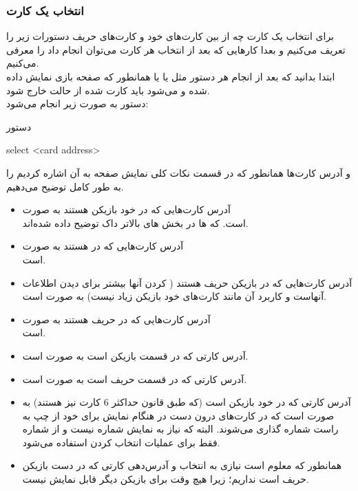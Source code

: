 \documentclass[]{article}
\begin{document}
\subsubsection*{{\titr انتخاب یک کارت}}
برای انتخاب یک کارت چه از بین کارت‌های خود و کارت‌های حریف دستورات زیر را 
تعریف می‌کنیم و بعدا کارهایی که بعد از انتخاب هر کارت می‌توان انجام داد را 
معرفی می‌کنیم.
\\
ابتدا بدانید که بعد از انجام هر دستور مثل  یا  یا 
 همانطور که صفحه بازی نمایش داده شده و  می‌شود باید 
کارت  شده از حالت  خارج شود.
\\
دستور  به صورت زیر انجام می‌شود:
\begin{mybox}[colback=yellow]{دستور}
	\begin{latin}	
		select <card address>
	\end{latin}
\end{mybox}
و آدرس کارت‌ها همانطور که در قسمت نکات کلی نمایش صفحه به آن اشاره کردیم را 
به طور کامل توضیح می‌دهیم.
\begin{itemize}
	\item
	آدرس کارت‌هایی که در  خود بازیکن هستند به صورت\\
	  است. که  ها در بخش های بالاتر داک توضیح داده شده‌اند.
	\item
	آدرس کارت‌هایی که در  هستند به صورت\\
	 است. 
	\item
	آدرس کارت‌هایی که در  بازیکن حریف هستند ( 
	کردن آنها بیشتر برای دیدن اطلاعات آنهاست و کاربرد آن مانند کارت‌های 
	خود 
	بازیکن زیاد نیست) به صورت  است.
	\item
	آدرس کارت‌هایی که در  حریف هستند به صورت\\
	  است.
	\item
	آدرس کارتی که در قسمت  بازیکن است به صورت  
	است.
	\item
	آدرس کارتی که در قسمت  حریف است به صورت
	  است.
	\item
	آدرس کارتی که در  خود بازیکن است (که طبق قانون حداکثر 6 کارت 
	نیز هستند) به صورت 
	 است که  در کارت‌های درون دست در هنگام نمایش برای خود از چپ به 
	 راست شماره گذاری می‌شوند. البته که نیاز به نمایش شماره نیست و از 
	 شماره فقط 
	 برای عملیات انتخاب کردن استفاده می‌شود.
	 \item
	 همانطور که معلوم است نیازی به انتخاب و آدرس‌دهی کارتی که در دست بازیکن 
	 حریف است نداریم؛ زیرا هیچ وقت برای بازیکن دیگر قابل نمایش نیست.	
\end{itemize}
\end{document}
